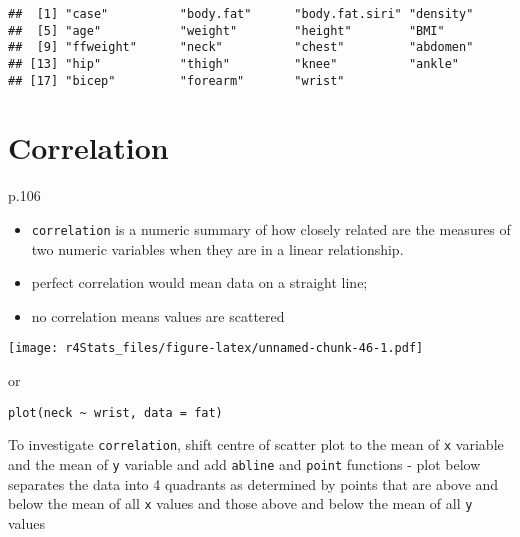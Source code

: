 \documentclass[
]{book}
\newenvironment{Shaded}{\begin{snugshade}}{\end{snugshade}}
\newcommand{\FunctionTok}[1]{\textcolor[rgb]{0.00,0.00,0.00}{#1}}
\newcommand{\NormalTok}[1]{#1}
\newcommand{\SpecialCharTok}[1]{\textcolor[rgb]{0.00,0.00,0.00}{#1}}
\providecommand{\tightlist}{%
  \setlength{\itemsep}{0pt}\setlength{\parskip}{0pt}}
\theoremstyle{definition}
\theoremstyle{definition}
\theoremstyle{definition}
\theoremstyle{definition}
\theoremstyle{remark}
\begin{document}
\begin{verbatim}
##  [1] "case"          "body.fat"      "body.fat.siri" "density"      
##  [5] "age"           "weight"        "height"        "BMI"          
##  [9] "ffweight"      "neck"          "chest"         "abdomen"      
## [13] "hip"           "thigh"         "knee"          "ankle"        
## [17] "bicep"         "forearm"       "wrist"
\end{verbatim}

\hypertarget{correlation}{%
\section{Correlation}\label{correlation}}

p.106

\begin{itemize}
\tightlist
\item
  \texttt{correlation} is a numeric summary of how closely related are the measures of two numeric variables when they are in a linear relationship.
\item
  perfect correlation would mean data on a straight line;
\item
  no correlation means values are scattered
\end{itemize}

\begin{Shaded}
\end{Shaded}

\texttt{[image: r4Stats\_files/figure-latex/unnamed-chunk-46-1.pdf]}

or

\texttt{plot(neck\ \textasciitilde{}\ wrist,\ data\ =\ fat)}

To investigate \texttt{correlation}, shift centre of scatter plot to the mean of \texttt{x} variable and the mean of \texttt{y} variable and add \texttt{abline} and \texttt{point} functions
- plot below separates the data into 4 quadrants as determined by points that are above and below the mean of all \texttt{x} values and those above and below the mean of all \texttt{y} values
\end{document}
